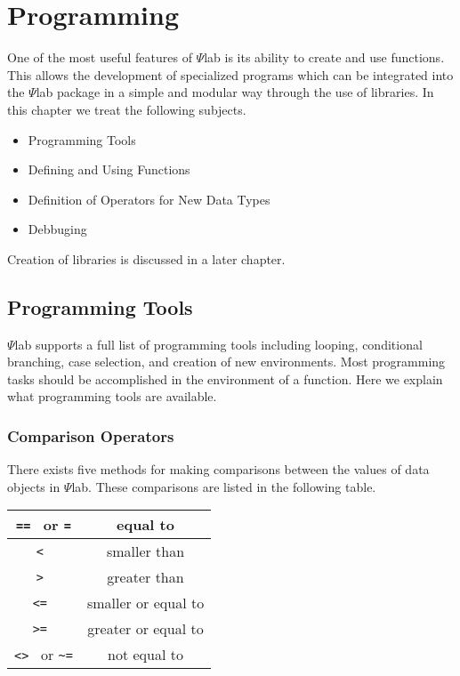 \chapter{Programming}
\label{ch4}

	One of the most useful features of $\Psi$lab is its ability
to create and use functions.  This allows the development of specialized
programs which can be integrated into the $\Psi$lab package in a simple and
modular way through the use of libraries.  In this chapter we 
treat the following subjects.
\begin{itemize}
	\item Programming Tools
	\item Defining and Using Functions
        \item Definition of Operators for New Data Types
	\item{Debbuging}
\end{itemize}	
Creation of libraries is discussed in a later chapter.

\section{Programming Tools}

	$\Psi$lab supports a full list of programming tools
including looping, conditional branching, case selection,
and creation of new environments.  Most programming tasks
should be accomplished in the environment of a function.
Here we explain what programming tools are available.

\subsection{Comparison Operators}
There exists five methods for making comparisons between the
values of data objects in $\Psi$lab. These comparisons are listed
in the following table.

\begin{center}
\begin{tabular}{|c|c|}
\hline
{\tt == } or {\tt =} & equal to \\ \hline
{\tt < } & smaller than \\ \hline
{\tt > } &  greater than \\ \hline
{\tt <= } & smaller or equal to \\ \hline
{\tt >= } & greater or equal to \\ \hline
{\tt <> } or {\verb!~=!} & not equal to \\ \hline
\end{tabular}
\end{center}

